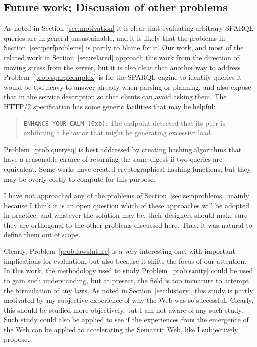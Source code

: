\subsection{Future work; Discussion of other problems}

As noted in Section~\ref{sec:motivation} it is clear that evaluating
arbitrary SPARQL queries are in general unsustainable, and it is
likely that the problems in Section~\ref{sec:perfproblems} is partly
to blame for it. Our work, and most of the related work in
Section~\ref{sec:related} approach this work from the direction of
moving stress from the server, but it is also clear that another way
to address Problem~\ref{prob:sparqlcomplex} is for the SPARQL engine
to identify queries it would be too heavy to answer already when
parsing or planning, and also expose that in the service description
so that clients can avoid asking them. The HTTP/2 specification
\cite{rfc7540} has some generic facilities that may be helpful: 

\begin{quote}
\texttt{ENHANCE\_YOUR\_CALM (0xb)}:  The endpoint detected that its peer is
      exhibiting a behavior that might be generating excessive load.
\end{quote}


Problem~\ref{prob:queryeq} is best addressed by creating hashing
algorithms that have a reasonable chance of returning the same digest
if two queries are equivalent. Some works have created cryptographical
hashing functions, but they may be overly costly to compute for this
purpose. %

I have not approached any of the problems of
Section~\ref{sec:semproblems}, mainly because I think it is an open
question which of these approaches will be adopted in practice, and
whatever the solution may be, their designers should make sure they
are orthogonal to the other problems discussed here. Thus, it was
natural to define them out of scope. 

Clearly, Problem~\ref{prob:lawsfuture} is a very interesting one, with
important implications for evaluation, but also because it shifts the
focus of our attention. In this work, the methodology used to study
Problem~\ref{prob:sanity} could be used to gain such understanding,
but at present, the field is too immature to attempt the formulation
of any laws. As noted in Section~\ref{sec:history}, this study is
partly motivated by my subjective experience of why the Web was so
successful. Clearly, this should be studied more objectively, but I am
not aware of any such study. Such study could also be applied to see
if the experiences from the emergence of the Web can be applied to
accelerating the Semantic Web, like I subjectively propose.

